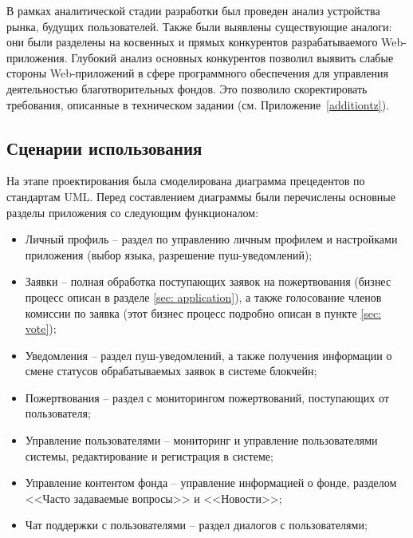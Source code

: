 \documentclass[a4paper,12pt,reqno]{article}
\begin{document}

В рамках аналитической стадии разработки был проведен анализ устройства рынка, будущих пользователей. Также были выявлены существующие аналоги: они были разделены на косвенных и прямых конкурентов разрабатываемого Web-приложения. Глубокий анализ основных конкурентов позволил выявить слабые стороны Web-приложений в сфере программного обеспечения для управления деятельностью благотворительных фондов. Это позволило скоректировать требования, описанные в техническом задании (см. Приложение~\ref{additiontz}).

\clearpage
\newpage


\setcounter{section}{2}
\setcounter{subsection}{0}


\subsection{Сценарии использования} \label{usecase}

На этапе проектирования была смоделирована диаграмма прецедентов по стандартам UML\cite{uml}. Перед составлением диаграммы были перечислены основные разделы приложения со следующим функционалом:
\begin{itemize}
    \item Личный профиль -- раздел по управлению личным профилем и настройками приложения (выбор языка, разрешение пуш-уведомлений);
    \item Заявки -- полная обработка поступающих заявок на пожертвования (бизнес процесс описан в разделе \ref{sec: application}), а также голосование членов комиссии по заявка (этот бизнес процесс подробно описан в пункте \ref{sec: vote});
    \item Уведомления -- раздел пуш-уведомлений, а также получения информации о смене статусов обрабатываемых заявок в системе блокчейн;
    \item Пожертвования -- раздел с мониторингом пожертвований, поступающих от пользователя;
    \item Управление пользователями -- мониторинг и управление пользователями системы, редактирование и регистрация в системе;
    \item Управление контентом фонда -- управление информацией о фонде, разделом <<Часто задаваемые вопросы>> и <<Новости>>;
    \item Чат поддержки с пользователями -- раздел диалогов с пользователями;
\end{itemize}
\end{document}
